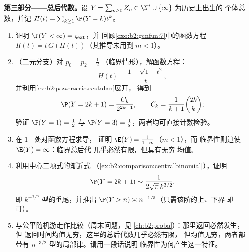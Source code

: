\begin{problem}
\medskip
\noindent\textbf{第三部分——总后代数。}设 $Y =
\sum_{n\geq0}Z_n \in \N^* \cup \{\infty\}$ 为历史上出生的
个体总数，并记 $H(t) =
\sum_{k\geq1}\P(Y = k)t^k$。
\begin{enumerate}[resume]
  \item 证明 $\P(Y < \infty) = q_{\mathrm{ext}}$，并
        回顾\cref{exo:b2:genfun:7}中的函数方程
        $H(t) = t\,G(H(t))$（其推导未用到
        $m < 1$）。
  \item （二元分支）对 $p_0 = p_2 = \frac12$
        （临界情形），解函数方程：
        \[
        H(t) = \frac{1 - \sqrt{1 - t^2}}{t},
        \]
        并利用\cref{ex:b2:powerseries:catalan}展开，
        得到
        \[
        \P(Y = 2k + 1) = \frac{C_k}{2^{2k+1}},
        \qquad C_k = \frac1{k+1}\binom{2k}k ;
        \]
        验证 $\P(Y = 1) = \frac12$ 与 $\P(Y = 3)
        = \frac18$，两者均可直接计数检验。
  \item 在 $1^-$ 处对函数方程求导，
        证明 $\E(Y) = \frac{1}{1-m}$（$m < 1$），而
        临界性则迫使 $\E(Y) = \infty$：临界总后代
        几乎必然有限，但具有无穷
        均值。
  \item 利用中心二项式的渐近式
        （\cref{ex:b2:comparison:centralbinomial}），证明
        \[
        \P(Y = 2k+1) \sim \frac{1}{2\sqrt\pi\,k^{3/2}},
        \]
        即 $k^{-3/2}$ 型的重尾，并推出 $\P(Y > n)
        \asymp n^{-1/2}$（只需该阶的上、下界
        即可）。
  \item 与公平随机游走作比较（周末问题，见
        \cref{ch:b2:proba}）：那里返回必然发生，但
        返回时间均值无穷，这里的总后代数几乎必然有限，
        但均值无穷，两者都带有
        $n^{-3/2}$ 型的局部律。请用一段话说明
        临界性为何产生这一特征。
\end{enumerate}


\end{problem}
